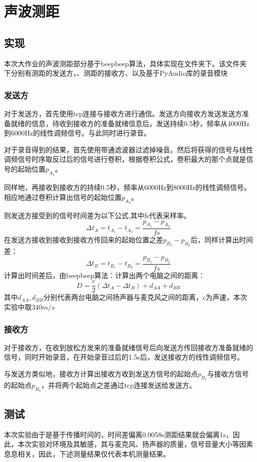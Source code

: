 \section{声波测距}
\subsection{实现}
本次大作业的声波测距部分基于beepbeep算法，具体实现在文件夹下。该文件夹下分别有测距的发送方，、测距的接收方、以及基于PyAudio库的录音模块
\subsubsection{发送方}
对于发送方，首先使用tcp连接与接收方进行通信。发送方向接收方发送发送方准备就绪的信息，待收到接收方的准备就绪信息后，发送持续0.5秒，频率从4000Hz到6000Hz的线性调频信号。与此同时进行录音。

对于录音得到的结果，首先使用带通滤波器过滤掉噪音。然后将获得的信号与线性调频信号时序取反过后的信号进行卷积，根据卷积公式，卷积最大的那个点就是信号的起始位置$p_{A_1}$。

同样地，再接收到接收方的持续0.5秒，频率从6000Hz到8000Hz的线性调频信号。相应地通过卷积计算出信号的起始位置$p_{A_2}$。

则发送方接受到的信号时间差为以下公式,其中fs代表采样率。
$$
\Delta t_A = t_{A_1} - t_{A_2}=\frac{p_{A_1}-p_{A_2}}{fs}
$$
在发送方接收到接收到接收方传回来的起始位置之差$p_{B_1}-p_{B_2}$后，同样计算出时间差：
$$
\Delta t_B = t_{B_1} - t_{B_2}=\frac{p_{B_1}-p_{B_2}}{fs}
$$
计算出时间差后，由beepbeep算法：计算出两个电脑之间的距离：
$$
D = \frac{c}{2}(\Delta t_A - \Delta t_B) + d_{AA} + d_{BB}
$$
其中$d_{AA} , d_{BB}$分别代表两台电脑之间扬声器与麦克风之间的距离，$c$为声速，本次实验中取$340m/s$
\subsubsection{接收方}
对于接收方，在收到放松方发来的准备就绪信号后向发送方传回接收方准备就绪的信号，同时开始录音，在开始录音过后的1.5s后，发送接收方的线性调频信号。

与发送方类似地，接收方计算出接收方收到发送方信号的起始点$p_{B_1}$与接收方信号的起始点$p_{B_2}$，并将两个起始点之差通过tcp连接发送给发送方。
\subsection{测试}
本次实验由于是基于传播时间的，时间差偏离0.0058s测距结果就会偏离1s，因此，本次实验对环境及其敏感，其与麦克风、扬声器的质量，信号音量大小等因素息息相关，因此，下述测量结果仅代表本机测量结果。

